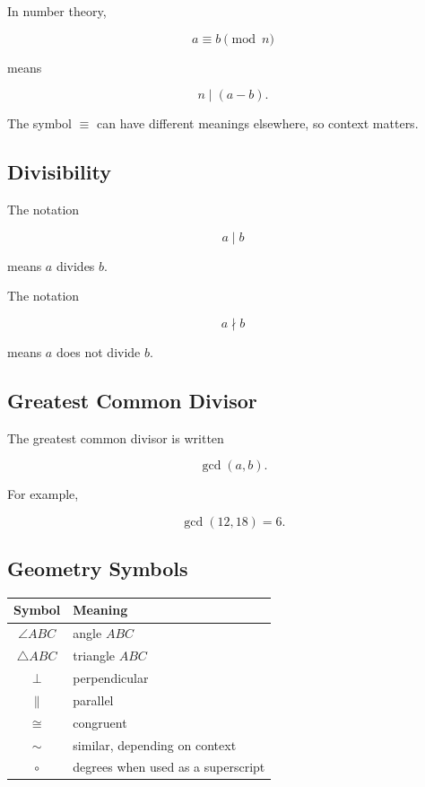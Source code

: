 In number theory,

\[
\boxed{
a\equiv b\pmod n
}
\]

means

\[
\boxed{
n\mid(a-b).
}
\]

The symbol \(\equiv\) can have different meanings elsewhere, so context
matters.

\subsection{Divisibility}
\label{subsec:divisibility-symbol-reference}

The notation

\[
\boxed{
a\mid b
}
\]

means \(a\) divides \(b\).

The notation

\[
\boxed{
a\nmid b
}
\]

means \(a\) does not divide \(b\).

\subsection{Greatest Common Divisor}
\label{subsec:gcd-reference}

The greatest common divisor is written

\[
\boxed{
\gcd(a,b).
}
\]

For example,

\[
\boxed{
\gcd(12,18)=6.
}
\]

\subsection{Geometry Symbols}
\label{subsec:geometry-symbols-reference}

\begin{center}
\begin{tabular}{c|l}
\textbf{Symbol} & \textbf{Meaning} \\ \hline
\( \angle ABC \) & angle \(ABC\) \\
\( \triangle ABC \) & triangle \(ABC\) \\
\( \perp \) & perpendicular \\
\( \parallel \) & parallel \\
\( \cong \) & congruent \\
\( \sim \) & similar, depending on context \\
\( \circ \) & degrees when used as a superscript
\end{tabular}
\end{center}

